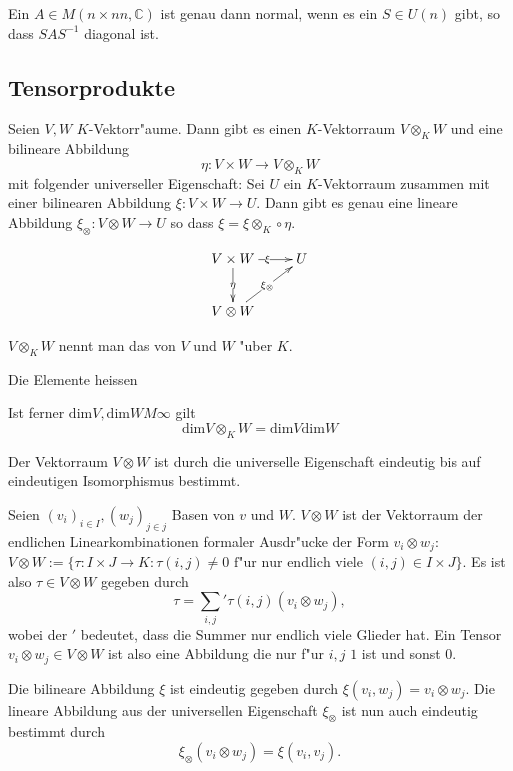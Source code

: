 \documentclass[11pt, a4paper]{article}
\begin{document}
\begin{corollary}
Ein $A \in M (n \times nn, \mathbb{C})$ ist genau dann normal, wenn es ein $S \in U(n)$ gibt, so dass $SAS^{-1}$ diagonal ist.
\end{corollary}



\subsection{Tensorprodukte}



\begin{theorem}
Seien $V, W$ $K$-Vektorr"aume. Dann gibt es einen $K$-Vektorraum $V \otimes_K W$ und eine bilineare Abbildung 
$$
\eta: V \times W \rightarrow V \otimes_K W
$$
mit folgender universeller Eigenschaft: Sei $U$ ein $K$-Vektorraum zusammen mit einer bilinearen Abbildung $\xi: V \times W \rightarrow U$. Dann gibt es genau eine lineare Abbildung $\xi_\otimes: V \otimes W \rightarrow U$ so dass $\xi = \xi\otimes_K \circ \eta$.

\begin{gather*}
  \xymatrix{V \times W  \ar[d]|{\eta} \ar[r]|{\xi} & U\\
    V \otimes W \ar[ur]|{\xi_\otimes} & }
\end{gather*}

$V \otimes_K W$ nennt man das  von $V$ und $W$ "uber $K$.

Die Elemente heissen 

Ist ferner $\mathrm{dim}V, \mathrm{dim}W M \infty$ gilt
$$
\mathrm{dim}V \otimes_K W = \mathrm{dim}V \mathrm{dim}W
$$
\end{theorem}


\begin{remark}
Der Vektorraum $V \otimes W$ ist durch die universelle Eigenschaft eindeutig bis auf eindeutigen Isomorphismus bestimmt. 
\end{remark}

\begin{remark}
Seien $(v_i)_{i \in I}, (w_j)_{j \in j}$ Basen von $v$ und $W$.
$V \otimes W$ ist der Vektorraum der endlichen Linearkombinationen formaler Ausdr"ucke der Form $v_i \otimes w_j$:
$V \otimes W := \{ \tau:  I \times J \rightarrow K : \tau(i, j) \neq 0 \text{ f"ur nur endlich viele } (i, j) \in I \times J \}$.
Es ist also $\tau \in V \otimes W$ gegeben durch 
$$
\tau = \sum\limits_{i, j} ' \tau(i, j) (v_i \otimes w_j),
$$
wobei der $'$ bedeutet, dass die Summer nur endlich viele Glieder hat.
Ein Tensor $v_i \otimes w_j \in V \otimes W$ ist also eine Abbildung die nur f"ur $i, j$ $1$ ist und sonst $0$.

Die bilineare Abbildung $\xi$ ist eindeutig gegeben durch $\xi(v_i, w_j) = v_i \otimes w_j$.
Die lineare Abbildung aus der universellen Eigenschaft $\xi_\otimes$ ist nun auch eindeutig bestimmt durch 
$$
\xi_\otimes(v_i \otimes w_j) = \xi(v_i, v_j).
$$
\end{remark}
\end{document}
